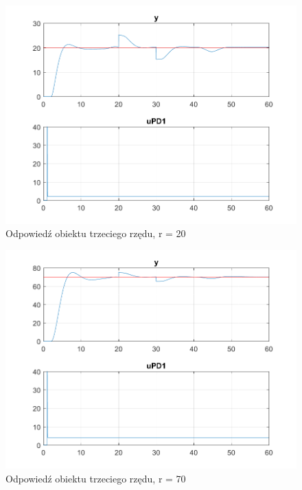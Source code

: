 \begin{figure}[]
	\centering
	\includegraphics[scale = 0.7]{fig/Z1_New_Signal_1/fig1_3_20.png}
	\caption		
	{Odpowiedź obiektu trzeciego rzędu, r = 20}
	\label{wykres_3}
\end{figure} 

\begin{figure}[]
	\centering
	\includegraphics[scale = 0.7]{fig/Z1_New_Signal_1/fig1_3_70.png}
	\caption		
	{Odpowiedź obiektu trzeciego rzędu, r = 70}
	\label{wykres_4}
\end{figure} 